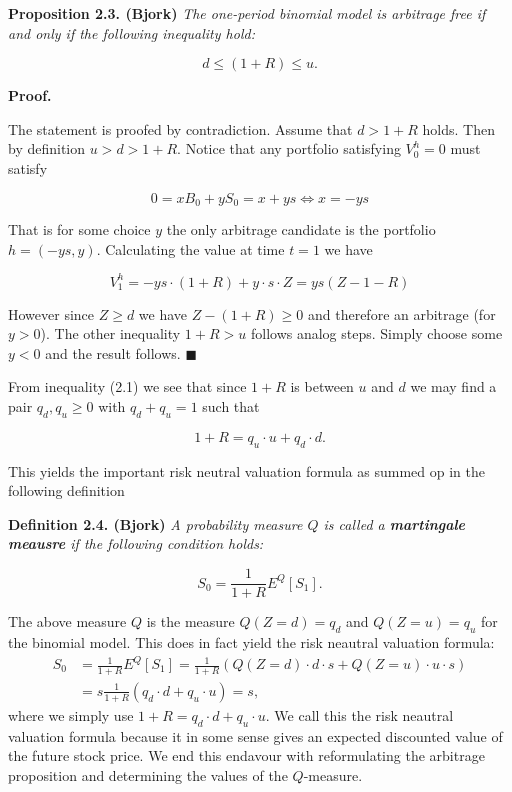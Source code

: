 \documentclass[a4paper,10pt,openany]{book}
\begin{document}
\textbf{Proposition 2.3. (Bjork)} \emph{The one-period binomial model is arbitrage free if and only if the following inequality hold:}

\[
d\le (1+R)\le u.\tag{2.1}
\]

\textbf{Proof.}

The statement is proofed by contradiction. Assume that \(d>1+R\) holds. Then by definition \(u>d>1+R\). Notice that any portfolio satisfying \(V_0^h=0\) must satisfy

\[
0=xB_0+yS_0=x+ys\iff x=-ys
\]

That is for some choice \(y\) the only arbitrage candidate is the portfolio \(h=(-ys,y)\). Calculating the value at time \(t=1\) we have

\[
V_1^h=-ys\cdot(1+R)+y\cdot s\cdot Z=ys(Z-1-R)
\]

However since \(Z\ge d\) we have \(Z-(1+R)\ge 0\) and therefore an arbitrage (for \(y>0\)). The other inequality \(1+R>u\) follows analog steps. Simply choose some \(y<0\) and the result follows. \(\blacksquare\)

From inequality (2.1) we see that since \(1+R\) is between \(u\) and \(d\) we may find a pair \(q_d,q_u\ge 0\) with \(q_d+q_u=1\) such that

\[
1+R=q_u\cdot u+q_d\cdot d.
\]

This yields the important risk neutral valuation formula as summed op in the following definition

\textbf{Definition 2.4. (Bjork)} \emph{A probability measure \(Q\) is called a \textbf{martingale meausre} if the following condition holds:}

\[
S_0=\frac{1}{1+R}E^Q[S_1].
\]

The above measure \(Q\) is the measure \(Q(Z=d)=q_d\) and \(Q(Z=u)=q_u\) for the binomial model. This does in fact yield the risk neautral valuation formula:
\begin{align*}
S_0&=\frac{1}{1+R}E^Q[S_1]=\frac{1}{1+R}(Q(Z=d)\cdot d\cdot s+Q(Z=u)\cdot u\cdot s)\\
&=s\frac{1}{1+R}(q_d\cdot d+q_u\cdot u)=s,
\end{align*}
where we simply use \(1+R=q_d\cdot d+q_u\cdot u\). We call this the risk neautral valuation formula because it in some sense gives an expected discounted value of the future stock price. We end this endavour with reformulating the arbitrage proposition and determining the values of the \(Q\)-measure.
\end{document}
